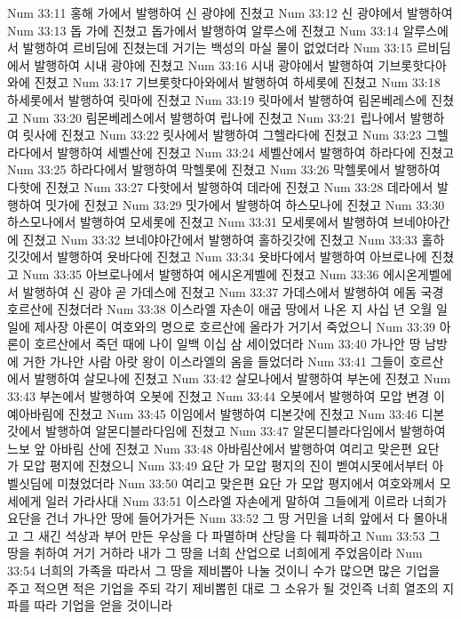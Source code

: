 Num 33:11  홍해 가에서 발행하여 신 광야에 진쳤고
Num 33:12  신 광야에서 발행하여
Num 33:13  돕 가에 진쳤고 돕가에서 발행하여 알루스에 진쳤고
Num 33:14  알루스에서 발행하여 르비딤에 진쳤는데 거기는 백성의 마실 물이 없었더라
Num 33:15  르비딤에서 발행하여 시내 광야에 진쳤고
Num 33:16  시내 광야에서 발행하여 기브롯핫다아와에 진쳤고
Num 33:17  기브롯핫다아와에서 발행하여 하세롯에 진쳤고
Num 33:18  하세롯에서 발행하여 릿마에 진쳤고
Num 33:19  릿마에서 발행하여 림몬베레스에 진쳤고
Num 33:20  림몬베레스에서 발행하여 립나에 진쳤고
Num 33:21  립나에서 발행하여 릿사에 진쳤고
Num 33:22  릿사에서 발행하여 그헬라다에 진쳤고
Num 33:23  그헬라다에서 발행하여 세벨산에 진쳤고
Num 33:24  세벨산에서 발행하여 하라다에 진쳤고
Num 33:25  하라다에서 발행하여 막헬롯에 진쳤고
Num 33:26  막헬롯에서 발행하여 다핫에 진쳤고
Num 33:27  다핫에서 발행하여 데라에 진쳤고
Num 33:28  데라에서 발행하여 밋가에 진쳤고
Num 33:29  밋가에서 발행하여 하스모나에 진쳤고
Num 33:30  하스모나에서 발행하여 모세롯에 진쳤고
Num 33:31  모세롯에서 발행하여 브네야아간에 진쳤고
Num 33:32  브네야아간에서 발행하여 홀하깃갓에 진쳤고
Num 33:33  홀하깃갓에서 발행하여 욧바다에 진쳤고
Num 33:34  욧바다에서 발행하여 아브로나에 진쳤고
Num 33:35  아브로나에서 발행하여 에시온게벨에 진쳤고
Num 33:36  에시온게벨에서 발행하여 신 광야 곧 가데스에 진쳤고
Num 33:37  가데스에서 발행하여 에돔 국경 호르산에 진쳤더라
Num 33:38  이스라엘 자손이 애굽 땅에서 나온 지 사십 년 오월 일 일에 제사장 아론이 여호와의 명으로 호르산에 올라가 거기서 죽었으니
Num 33:39  아론이 호르산에서 죽던 때에 나이 일백 이십 삼 세이었더라
Num 33:40  가나안 땅 남방에 거한 가나안 사람 아랏 왕이 이스라엘의 옴을 들었더라
Num 33:41  그들이 호르산에서 발행하여 살모나에 진쳤고
Num 33:42  살모나에서 발행하여 부논에 진쳤고
Num 33:43  부논에서 발행하여 오봇에 진쳤고
Num 33:44  오봇에서 발행하여 모압 변경 이예아바림에 진쳤고
Num 33:45  이임에서 발행하여 디본갓에 진쳤고
Num 33:46  디본갓에서 발행하여 알몬디블라다임에 진쳤고
Num 33:47  알몬디블라다임에서 발행하여 느보 앞 아바림 산에 진쳤고
Num 33:48  아바림산에서 발행하여 여리고 맞은편 요단 가 모압 평지에 진쳤으니
Num 33:49  요단 가 모압 평지의 진이 벧여시못에서부터 아벨싯딤에 미쳤었더라
Num 33:50  여리고 맞은편 요단 가 모압 평지에서 여호와께서 모세에게 일러 가라사대
Num 33:51  이스라엘 자손에게 말하여 그들에게 이르라 너희가 요단을 건너 가나안 땅에 들어가거든
Num 33:52  그 땅 거민을 너희 앞에서 다 몰아내고 그 새긴 석상과 부어 만든 우상을 다 파멸하며 산당을 다 훼파하고
Num 33:53  그 땅을 취하여 거기 거하라 내가 그 땅을 너희 산업으로 너희에게 주었음이라
Num 33:54  너희의 가족을 따라서 그 땅을 제비뽑아 나눌 것이니 수가 많으면 많은 기업을 주고 적으면 적은 기업을 주되 각기 제비뽑힌 대로 그 소유가 될 것인즉 너희 열조의 지파를 따라 기업을 얻을 것이니라
